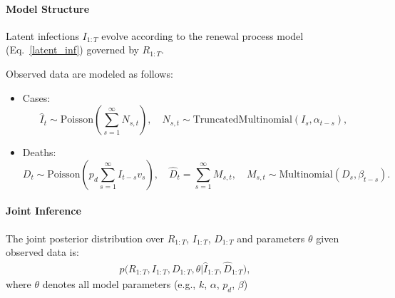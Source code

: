 \documentclass{article}
\begin{document}
\paragraph{Model Structure}

Latent infections $I_{1:T}$ evolve according to the renewal process model (Eq.~\eqref{latent_inf}) governed by $R_{1:T}$.

Observed data are modeled as follows:
\begin{itemize}
    \item Cases:
    \[
    \widehat{I}_t \sim \mathrm{Poisson}\left( \sum_{s=1}^\infty N_{s,t} \right), \quad N_{s,t} \sim \mathrm{TruncatedMultinomial}(I_s, \alpha_{t-s}),
    \]
    \item Deaths:
    \[
    D_t \sim \mathrm{Poisson}\left( p_d \sum_{s=1}^\infty I_{t-s} v_s \right), \quad \widehat{D}_t = \sum_{s=1}^\infty M_{s,t}, \quad M_{s,t} \sim \mathrm{Multinomial}(D_s, \beta_{t-s}).
    \]
\end{itemize}

\paragraph{Joint Inference}

The joint posterior distribution over $R_{1:T}$, $I_{1:T}$, $D_{1:T}$ and parameters $\theta$ given observed data is:
\begin{align}
p\big(R_{1:T}, I_{1:T}, D_{1:T}, \theta | \widehat{I}_{1:T}, \widehat{D}_{1:T}\big), 
\end{align}
where $\theta$ denotes all model parameters (e.g., $k$, $\alpha$, $p_d$, $\beta$)
\end{document}
